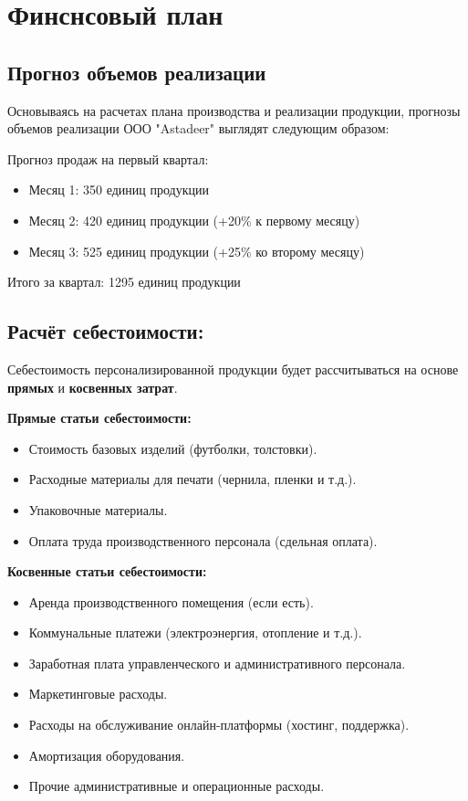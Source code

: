  \section{Финснсовый план}

\subsection{Прогноз объемов реализации}

Основываясь на расчетах плана производства и реализации продукции, прогнозы объемов реализации ООО "Astadeer" выглядят следующим образом:

Прогноз продаж на первый квартал:

\begin{itemize}
    \item Месяц 1: 350 единиц продукции
    \item Месяц 2: 420 единиц продукции (+20\% к первому месяцу)
    \item Месяц 3: 525 единиц продукции (+25\% ко второму месяцу)
\end{itemize}
Итого за квартал: 1295 единиц продукции

\subsection{Расчёт себестоимости:}

Себестоимость персонализированной продукции будет рассчитываться на основе \textbf{прямых} и \textbf{косвенных затрат}.

\textbf{Прямые статьи себестоимости:}

\begin{itemize}[noitemsep]
    \item Стоимость базовых изделий (футболки, толстовки).
    \item Расходные материалы для печати (чернила, пленки и т.д.).
    \item Упаковочные материалы.
    \item Оплата труда производственного персонала (сдельная оплата).
\end{itemize}

\textbf{Косвенные статьи себестоимости:}
\begin{itemize}[noitemsep]
\item Аренда производственного помещения (если есть).
\item Коммунальные платежи (электроэнергия, отопление и т.д.).
\item Заработная плата управленческого и административного персонала.
\item Маркетинговые расходы.
\item Расходы на обслуживание онлайн-платформы (хостинг, поддержка).
\item Амортизация оборудования.
\item Прочие административные и операционные расходы.
\end{itemize}

